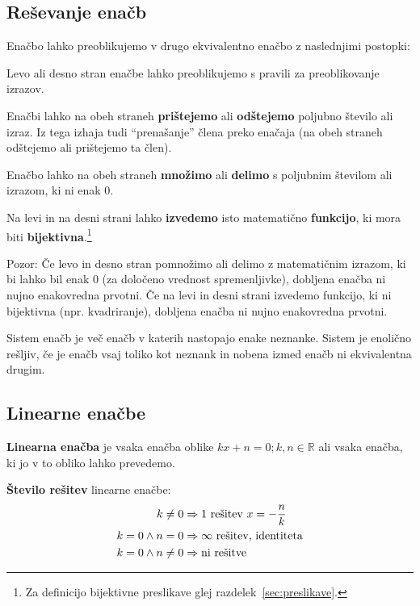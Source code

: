 \documentclass[a4paper,oneside,12pt,fleqn]{article}
\def\R{\ensuremath{\mathbb R}}
\renewcommand\implies\Rightarrow
\numberwithin{equation}{section}
\newenvironment{itemize*}%
{
\vspace{-12pt}%
\begin{itemize}%
\setlength{\itemsep}{0pt}%
\setlength{\parskip}{2pt}}%
{\end{itemize}}
\begin{document}
\subsection{Reševanje enačb}
\label{sec:enac:resev}
Enačbo lahko preoblikujemo v drugo ekvivalentno enačbo z naslednjimi postopki:
\begin{itemize*}
  \item Levo ali desno stran enačbe lahko preoblikujemo s pravili za preoblikovanje
    izrazov.
  \item Enačbi lahko na obeh straneh \textbf{prištejemo} ali \textbf{odštejemo} poljubno število
ali izraz. Iz tega izhaja tudi ``prenašanje'' člena preko enačaja (na obeh straneh odštejemo ali
prištejemo ta člen).

  \item Enačbo lahko na obeh straneh \textbf{množimo} ali \textbf{delimo} s poljubnim številom ali izrazom, ki ni
enak 0. 

  \item Na levi in na desni strani lahko \textbf{izvedemo} isto matematično \textbf{funkcijo}, ki mora biti
\textbf{bijektivna}.\footnote{Za definicijo bijektivne preslikave glej
razdelek~\ref{sec:preslikave}.}
\end{itemize*}

Pozor: Če levo in desno stran pomnožimo ali delimo z matematičnim izrazom, ki bi lahko bil
enak 0 (za določeno vrednost spremenljivke), dobljena enačba ni nujno enakovredna prvotni.
Če na levi in desni strani izvedemo funkcijo, ki ni bijektivna (npr. kvadriranje),
dobljena enačba ni nujno enakovredna prvotni.

Sistem enačb je več enačb v katerih nastopajo enake neznanke. Sistem je enolično rešljiv,
če je enačb vsaj toliko kot neznank in nobena izmed enačb ni ekvivalentna drugim.

\subsection{Linearne enačbe}
\label{sec:enac:lin}
\textbf{Linearna enačba} je vsaka enačba oblike $kx + n = 0; k, n \in \R$ ali vsaka enačba, ki jo v to
obliko lahko prevedemo.

\textbf{Število rešitev} linearne enačbe:
\begin{align*}
  k \neq 0 &\implies \textnormal{1 rešitev } x = -\frac{n}{k} \\
  k = 0 \land n = 0 &\implies \infty \textnormal{ rešitev, identiteta} \\
  k = 0 \land n \neq 0 &\implies \textnormal{ni rešitve}
\end{align*}
\end{document}
